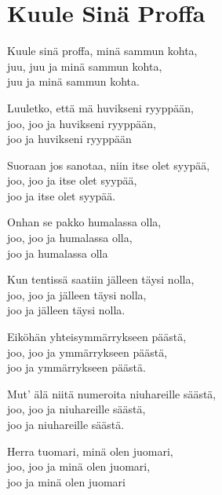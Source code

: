 \section{Kuule Sinä Proffa}
Kuule sinä proffa, minä sammun kohta,\\
juu, juu ja minä sammun kohta,\\
juu ja minä sammun kohta.

Luuletko, että mä huvikseni ryyppään,\\
joo, joo ja huvikseni ryyppään,\\
joo ja huvikseni ryyppään

Suoraan jos sanotaa, niin itse olet syypää,\\
joo, joo ja itse olet syypää,\\
joo ja itse olet syypää.

Onhan se pakko humalassa olla,\\
joo, joo ja humalassa olla,\\
joo ja humalassa olla

Kun tentissä saatiin jälleen täysi nolla,\\
joo, joo ja jälleen täysi nolla,\\
joo ja jälleen täysi nolla.

Eiköhän yhteisymmärrykseen päästä,\\
joo, joo ja ymmärrykseen päästä,\\
joo ja ymmärrykseen päästä.

Mut' älä niitä numeroita niuhareille säästä,\\
joo, joo ja niuhareille säästä,\\
joo ja niuhareille säästä.

Herra tuomari, minä olen juomari,\\
joo, joo ja minä olen juomari,\\
joo ja minä olen juomari